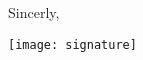 \documentclass{letter}
\begin{document}
\longindentation=0pt

\begin{letter}{  }

\opening{  }


\vspace{1 em}

\closing{Sincerly,}


\vspace{-.85in}
\texttt{[image: signature]}

\end{letter}
\end{document}
